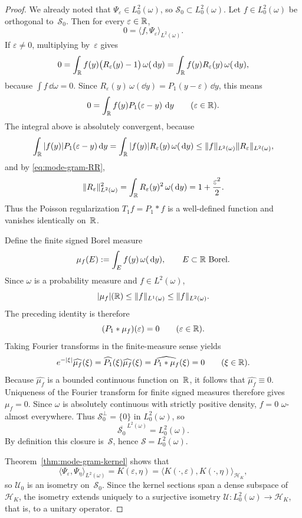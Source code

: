 \begin{proof}
We already noted that $\Psi_\varepsilon\in L^2_0(\omega)$, so
$\mathcal S_0\subset L^2_0(\omega)$.  Let
$f\in L^2_0(\omega)$ be orthogonal to~$\mathcal S_0$.  Then for every
$\varepsilon\in\mathbb{R}$,
\[
0=\langle f,\Psi_\varepsilon\rangle_{L^2(\omega)}.
\]
If $\varepsilon\neq 0$, multiplying by~$\varepsilon$ gives
\[
0=\int_{\mathbb{R}}f(y)\bigl(R_\varepsilon(y)-1\bigr)\,\omega(\,\mathrm{d} y)
=\int_{\mathbb{R}}f(y)R_\varepsilon(y)\,\omega(\,\mathrm{d} y),
\]
because $\int f\,\dd\omega=0$.  Since
$R_\varepsilon(y)\,\omega(\dd y)=P_1(y-\varepsilon)\,\dd y$, this means
\[
0=\int_{\mathbb{R}}f(y)P_1(\varepsilon-y)\,\,\mathrm{d} y
\qquad(\varepsilon\in\mathbb{R}).
\]
The integral above is absolutely convergent, because
\[
\int_{\mathbb{R}}|f(y)|P_1(\varepsilon-y)\,\mathrm{d} y
=\int_{\mathbb{R}}|f(y)|R_\varepsilon(y)\,\omega(\,\mathrm{d} y)
\le \|f\|_{L^2(\omega)}\|R_\varepsilon\|_{L^2(\omega)},
\]
and by \eqref{eq:mode-gram-RR},
\[
\|R_\varepsilon\|_{L^2(\omega)}^2
=\int_{\mathbb{R}}R_\varepsilon(y)^2\,\omega(\,\mathrm{d} y)
=1+\frac{\varepsilon^2}{2}.
\]
Thus the Poisson regularization $T_1f=P_1*f$ is a well-defined function
and vanishes identically on~$\mathbb{R}$.

Define the finite signed Borel measure
\[
\mu_f(E):=\int_E f(y)\,\omega(\,\mathrm{d} y),
\qquad E\subset\mathbb{R}\ \text{Borel}.
\]
Since $\omega$ is a probability measure and $f\in L^2(\omega)$,
\[
|\mu_f|(\mathbb{R})\le \|f\|_{L^1(\omega)}\le \|f\|_{L^2(\omega)}.
\]
The preceding identity is therefore
\[
(P_1*\mu_f)(\varepsilon)=0
\qquad(\varepsilon\in\mathbb{R}).
\]
Taking Fourier transforms in the finite-measure sense yields
\[
e^{-|\xi|}\widehat{\mu_f}(\xi)
=\widehat{P_1}(\xi)\widehat{\mu_f}(\xi)
=\widehat{P_1*\mu_f}(\xi)
=0
\qquad(\xi\in\mathbb{R}).
\]
Because $\widehat{\mu_f}$ is a bounded continuous function on~$\mathbb{R}$, it
follows that $\widehat{\mu_f}\equiv 0$.  Uniqueness of the Fourier
transform for finite signed measures \cite[Chapter~II]{Lukacs1970}
therefore gives $\mu_f=0$.  Since $\omega$ is absolutely continuous with
strictly positive density, $f=0$ $\omega$-almost everywhere.  Thus
$\mathcal S_0^\perp=\{0\}$ in $L^2_0(\omega)$, so
\[
\overline{\mathcal S_0}^{\,L^2(\omega)}=L^2_0(\omega).
\]
By definition this closure is~$\mathcal S$, hence
$\mathcal S=L^2_0(\omega)$.

Theorem~\ref{thm:mode-gram-kernel} shows that
\[
\langle \Psi_\varepsilon,\Psi_\eta\rangle_{L^2(\omega)}
=K(\varepsilon,\eta)
=\langle K(\cdot,\varepsilon),K(\cdot,\eta)\rangle_{\mathcal H_K},
\]
so $\mathcal U_0$ is an isometry on~$\mathcal S_0$.  Since the
kernel sections span a dense subspace of~$\mathcal H_K$, the isometry
extends uniquely to a surjective isometry
$\mathcal U:L^2_0(\omega)\to\mathcal H_K$, that is, to a unitary
operator.
\end{proof}

